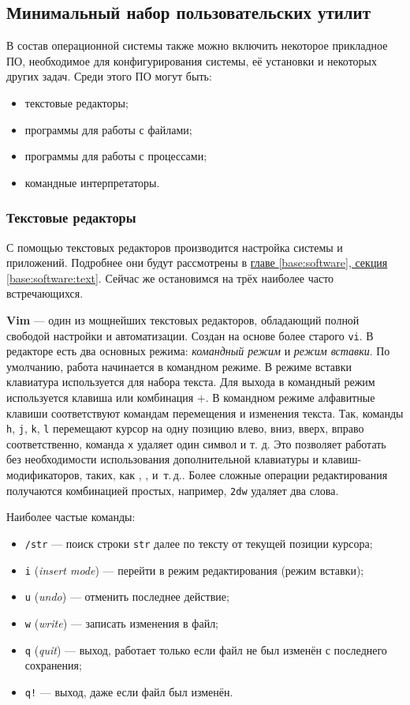 \subsection{Минимальный набор пользовательских утилит}\label{base:os:structure:userutils}
В состав операционной системы также можно включить некоторое прикладное ПО, необходимое для конфигурирования системы, её установки и некоторых других задач. Среди этого ПО могут быть:
\begin{itemize}
 \item текстовые редакторы;
 \item программы для работы с файлами;
 \item программы для работы с процессами;
 \item командные интерпретаторы.
\end{itemize}

\subsubsection{Текстовые редакторы}\label{base:os:structure:userutils:texteditors}
С помощью текстовых редакторов производится настройка системы и приложений. Подробнее они будут рассмотрены в \hyperref[base:software:text]{главе \ref*{base:software}, секция \ref*{base:software:text}}. Сейчас же остановимся на трёх наиболее часто встречающихся.

\textbf{Vim} --- один из мощнейших текстовых редакторов, обладающий полной свободой настройки и автоматизации. Создан на основе более старого \texttt{vi}. В редакторе есть два основных режима: \emph{командный режим} и \emph{режим вставки}. По умолчанию, работа начинается в командном режиме.
В режиме вставки клавиатура используется для набора текста. Для выхода в командный режим используется клавиша \Esc или комбинация \Ctrl$+$.
В командном режиме алфавитные клавиши соответствуют командам перемещения и изменения текста. Так, команды \texttt{h}, \texttt{j}, \texttt{k}, \texttt{l} перемещают курсор на одну позицию влево, вниз, вверх, вправо соответственно, команда \texttt{x} удаляет один символ и т. д. Это позволяет работать без необходимости использования дополнительной клавиатуры и клавиш-модификаторов, таких, как \Ctrl, \Alt, и~т.\,д.. Более сложные операции редактирования получаются комбинацией простых, например, \texttt{2dw} удаляет два слова.

Наиболее частые команды:
\begin{itemize}
 \item \texttt{/str} --- поиск строки \texttt{str} далее по тексту от текущей позиции курсора;
 \item \texttt{i} (\emph{insert mode}) --- перейти в режим редактирования (режим вставки);
 \item \texttt{u} (\emph{undo}) --- отменить последнее действие;
 \item \texttt{w} (\emph{write}) --- записать изменения в файл;
 \item \texttt{q} (\emph{quit}) --- выход, работает только если файл не был изменён с последнего сохранения;
 \item \texttt{q!} --- выход, даже если файл был изменён.
\end{itemize}

